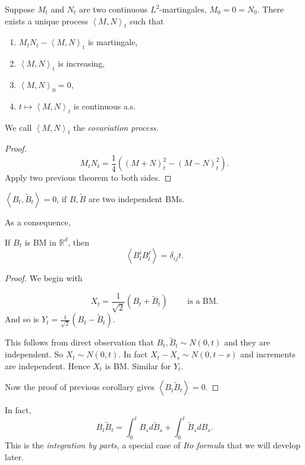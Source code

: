 \begin{corollary}[Covariation]
	Suppose $M_t$ and $N_t$ are two continuous $L^2$-martingales, $M_0 = 0 = N_0$. There exists a unique process $\left\langle M, N \right\rangle _t$ such that
	\begin{enumerate}
		\item $M_t N_t - \left\langle M, N \right\rangle _t$ is martingale,
		\item $\left\langle M, N \right\rangle _t$ is increasing,
		\item $\left\langle M, N \right\rangle _0 = 0$,
		\item $t \mapsto \left\langle M, N \right\rangle _t$ is continuous a.s.
	\end{enumerate}
	We call $\left\langle M, N \right\rangle _t$ the \textit{covariation process.}
\end{corollary}
\begin{proof}
	\[
		M_t N_t = \frac{1}{4} \left( (M + N)^2_t - (M - N)^2 _t \right) 
	.\] 
	Apply two previous theorem to both sides.
\end{proof}

\begin{example}
$\left\langle B_t, \tilde B_t \right\rangle = 0$, if $B, \tilde B$ are two independent BMs. 
\end{example}
As a consequence,
\begin{corollary}
	If $B_t$ is BM in $\mathbb{R}^d$, then 
	\[
		\left\langle B_t^i B_t^j \right\rangle = \delta_{i j} t
	.\] 
\end{corollary}
\begin{proof}
	We begin with
\begin{claim}
	\[
		X_t = \frac{1}{\sqrt{2} } \left( B_t + \tilde B_t \right)  \qquad \text{ is a BM}
	.\] 
	And so is $Y_t = \frac{1}{\sqrt{2} } (B_t- \tilde B_t)$.
\end{claim}
This follows from direct observation that $B_t, \tilde B_t \sim N\left( 0,t \right) $ and they are independent. So $X_t \sim N(0,t)$. In fact $X_t - X_s \sim N(0,t -s )$ and increments are independent. Hence $X_t$ is BM. Similar for $Y_t$.

Now the proof of previous corollary gives $\left\langle B_t \tilde B_t \right\rangle = 0$.
\end{proof}

In fact,
\[
	B_t \tilde B_t = \int_0^t B_s d \tilde B_s + \int_0^t \tilde B_s d B_s
.\] 
This is the \textit{integration by parts}, a special case of \textit{Ito formula} that we will develop later. 

